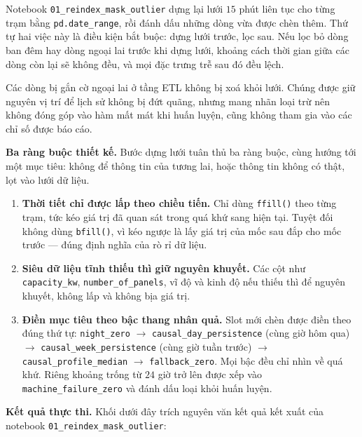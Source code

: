 \documentclass[12pt, a4paper]{report}
\begin{document}
Notebook \texttt{01\_reindex\_mask\_outlier} dựng lại lưới $15$ phút liên tục cho từng trạm
bằng \texttt{pd.date\_range}, rồi đánh dấu những dòng vừa được chèn thêm. Thứ tự hai
việc này là điều kiện bắt buộc: dựng lưới trước, lọc sau. Nếu lọc bỏ dòng ban
đêm hay dòng ngoại lai trước khi dựng lưới, khoảng cách thời gian giữa các dòng còn lại
sẽ không đều, và mọi đặc trưng trễ sau đó đều lệch.

Các dòng bị gắn cờ ngoại lai ở tầng ETL không bị xoá khỏi lưới. Chúng được giữ nguyên
vị trí để lịch sử không bị đứt quãng, nhưng mang nhãn loại trừ nên không đóng góp vào
hàm mất mát khi huấn luyện, cũng không tham gia vào các chỉ số được báo cáo.

\textbf{Ba ràng buộc thiết kế.} Bước dựng lưới tuân thủ ba ràng buộc, cùng hướng tới một
mục tiêu: không để thông tin của tương lai, hoặc thông tin không có thật, lọt vào lưới dữ liệu.

\begin{enumerate}
    \item \textbf{Thời tiết chỉ được lấp theo chiều tiến.} Chỉ dùng \texttt{ffill()} theo
    từng trạm, tức kéo giá trị đã quan sát trong quá khứ sang hiện tại. Tuyệt đối không
    dùng \texttt{bfill()}, vì kéo ngược là lấy giá trị của mốc sau đắp cho mốc trước --- đúng
    định nghĩa của rò rỉ dữ liệu.
    \item \textbf{Siêu dữ liệu tĩnh thiếu thì giữ nguyên khuyết.} Các cột như
    \texttt{capacity\_kw}, \texttt{number\_of\_panels}, vĩ độ và kinh độ nếu thiếu thì để nguyên
    khuyết, không lấp và không bịa giá trị.
    \item \textbf{Điền mục tiêu theo bậc thang nhân quả.} Slot mới chèn được điền theo đúng
    thứ tự: \texttt{night\_zero} $\rightarrow$ \texttt{causal\_day\_persistence} (cùng giờ hôm qua)
    $\rightarrow$ \texttt{causal\_week\_persistence} (cùng giờ tuần trước) $\rightarrow$
    \texttt{causal\_profile\_median} $\rightarrow$ \texttt{fallback\_zero}. Mọi bậc đều chỉ nhìn về
    quá khứ. Riêng khoảng trống từ $24$ giờ trở lên được xếp vào \texttt{machine\_failure\_zero}
    và đánh dấu loại khỏi huấn luyện.
\end{enumerate}

\textbf{Kết quả thực thi.} Khối dưới đây trích nguyên văn kết quả kết xuất của notebook
\texttt{01\_reindex\_mask\_outlier}:
\end{document}
